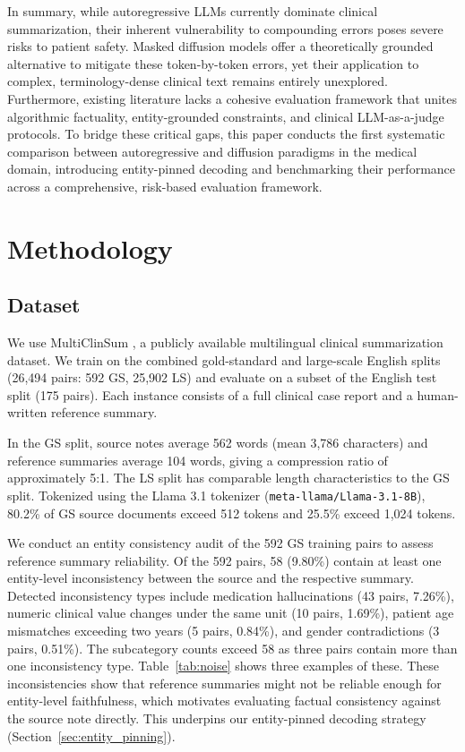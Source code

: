 \documentclass[11pt]{article}
\begin{document}
In summary, while autoregressive LLMs currently dominate clinical summarization, their inherent vulnerability to compounding errors poses severe risks to patient safety. Masked diffusion models offer a theoretically grounded alternative to mitigate these token-by-token errors, yet their application to complex, terminology-dense clinical text remains entirely unexplored. Furthermore, existing literature lacks a cohesive evaluation framework that unites algorithmic factuality, entity-grounded constraints, and clinical LLM-as-a-judge protocols. To bridge these critical gaps, this paper conducts the first systematic comparison between autoregressive and diffusion paradigms in the medical domain, introducing entity-pinned decoding and benchmarking their performance across a comprehensive, risk-based evaluation framework.



\section{Methodology}

\subsection{Dataset}
\label{sec:dataset}

We use MultiClinSum \citep{rodriguez2025multiclinsum}, a publicly
available multilingual clinical summarization dataset. We train on the combined gold-standard and
large-scale English splits (26,494 pairs: 592 GS, 25,902 LS)
and evaluate on a subset of the English test split (175 pairs).
Each instance consists of a full clinical case report and a human-written
reference summary.

In the GS split, source notes average 562 words (mean 3,786 characters)
and reference summaries average 104 words, giving a compression ratio
of approximately 5:1. The LS split has comparable length
characteristics to the GS split. Tokenized using the Llama 3.1 tokenizer (\texttt{meta-llama/Llama-3.1-8B}), 80.2\% of GS source documents exceed 512 tokens and 25.5\% exceed
1,024 tokens.

We conduct an entity consistency audit of the 592 GS training pairs to
assess reference summary reliability. Of the 592 pairs, 58 (9.80\%)
contain at least one entity-level inconsistency between the source and
the respective summary. Detected inconsistency types include medication
hallucinations (43 pairs, 7.26\%), numeric clinical value changes under
the same unit (10 pairs, 1.69\%), patient age mismatches exceeding two
years (5 pairs, 0.84\%), and gender contradictions (3 pairs, 0.51\%).
The subcategory counts exceed 58 as three pairs contain more than one
inconsistency type. Table~\ref{tab:noise} shows three examples of these. These inconsistencies show that reference summaries might not be reliable enough for entity-level faithfulness, which motivates evaluating factual consistency against the source note directly. This underpins our
entity-pinned decoding strategy (Section~\ref{sec:entity_pinning}).
\end{document}
